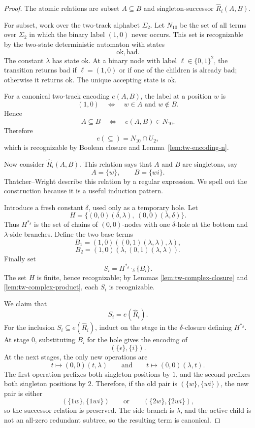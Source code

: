 \documentclass[11pt]{article}
\theoremstyle{definition}
\newcommand{\TW}{Thatcher--Wright}
\begin{document}
\begin{proof}
The atomic relations are subset \(A\subseteq B\) and singleton-successor
\(\widehat R_i(A,B)\).

For subset, work over the two-track alphabet \(\Sigma_2\).  Let \(N_{10}\) be
the set of all terms over \(\Sigma_2\) in which the binary label \((1,0)\) never
occurs.  This set is recognizable by the two-state deterministic automaton with
states
\[
  \mathrm{ok},\mathrm{bad}.
\]
The constant \(\lambda\) has state \(\mathrm{ok}\).  At a binary node with label
\(\ell\in\{0,1\}^2\), the transition returns \(\mathrm{bad}\) if
\(\ell=(1,0)\) or if one of the children is already \(\mathrm{bad}\); otherwise
it returns \(\mathrm{ok}\).  The unique accepting state is \(\mathrm{ok}\).

For a canonical two-track encoding \(e(A,B)\), the label at a position \(w\) is
\[
  (1,0)
  \quad\Longleftrightarrow\quad
  w\in A \text{ and } w\notin B.
\]
Hence
\[
  A\subseteq B
  \quad\Longleftrightarrow\quad
  e(A,B)\in N_{10}.
\]
Therefore
\[
  e(\subseteq)=N_{10}\cap U_2,
\]
which is recognizable by Boolean closure and Lemma~\ref{lem:tw-encoding-n}.

Now consider \(\widehat R_i(A,B)\).  This relation says that \(A\) and \(B\) are
singletons, say
\[
  A=\{w\},\qquad B=\{wi\}.
\]
\TW{} describe this relation by a regular expression.  We spell out the
construction because it is a useful induction pattern.

Introduce a fresh constant \(\delta\), used only as a temporary hole.  Let
\[
  H=\{(0,0)(\delta,\lambda),\ (0,0)(\lambda,\delta)\}.
\]
Thus \(H^{*_\delta}\) is the set of chains of \((0,0)\)-nodes with one
\(\delta\)-hole at the bottom and \(\lambda\)-side branches.  Define the two base
terms
\[
  B_1=(1,0)((0,1)(\lambda,\lambda),\lambda),
\]
\[
  B_2=(1,0)(\lambda,(0,1)(\lambda,\lambda)).
\]
Finally set
\[
  S_i=H^{*_\delta}\cdot_\delta\{B_i\}.
\]
The set \(H\) is finite, hence recognizable; by Lemmas
\ref{lem:tw-complex-closure} and \ref{lem:tw-complex-product}, each \(S_i\) is
recognizable.

We claim that
\[
  S_i=e(\widehat R_i).
\]
For the inclusion \(S_i\subseteq e(\widehat R_i)\), induct on the stage in the
\(\delta\)-closure defining \(H^{*_\delta}\).  At stage \(0\), substituting
\(B_i\) for the hole gives the encoding of
\[
  (\{\epsilon\},\{i\}).
\]
At the next stages, the only new operations are
\[
  t\mapsto (0,0)(t,\lambda)
  \qquad\text{and}\qquad
  t\mapsto (0,0)(\lambda,t).
\]
The first operation prefixes both singleton positions by \(1\), and the second
prefixes both singleton positions by \(2\).  Therefore, if the old pair is
\((\{w\},\{wi\})\), the new pair is either
\[
  (\{1w\},\{1wi\})
  \qquad\text{or}\qquad
  (\{2w\},\{2wi\}),
\]
so the successor relation is preserved.  The side branch is \(\lambda\), and
the active child is not an all-zero redundant subtree, so the resulting term is
canonical.


\end{proof}
\end{document}
